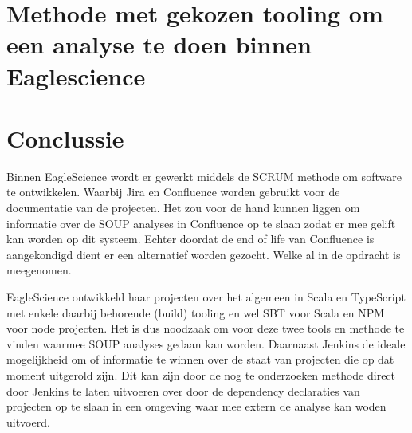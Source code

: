 %
%
\section{Methode met gekozen tooling om een analyse te doen binnen Eaglescience}\label{Methode}

\section{Conclussie}\label{sec:ESconclussie}
Binnen EagleScience wordt er gewerkt middels de SCRUM methode om software te ontwikkelen. Waarbij Jira en Confluence worden gebruikt voor de documentatie van de projecten. Het zou voor de hand kunnen liggen om informatie over de SOUP analyses in Confluence op te slaan zodat er mee gelift kan worden op dit systeem. Echter doordat de end of life van Confluence is aangekondigd dient er een alternatief worden gezocht. Welke al in de opdracht is meegenomen.

EagleScience ontwikkeld haar projecten over het algemeen in Scala en TypeScript met enkele daarbij behorende (build) tooling en wel SBT voor Scala en NPM voor node projecten. Het is dus noodzaak om voor deze twee tools en methode te vinden waarmee SOUP analyses gedaan kan worden. Daarnaast Jenkins de ideale mogelijkheid om of informatie te winnen over de staat van projecten die op dat moment uitgerold zijn. Dit kan zijn door de nog te onderzoeken methode direct door Jenkins te laten uitvoeren over door de dependency declaraties van projecten op te slaan in een omgeving waar mee extern de analyse kan woden uitvoerd.
